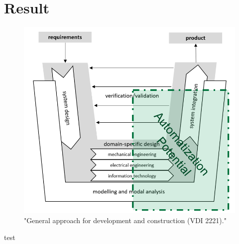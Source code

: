 \section{Result}

\begin{figure}[h]
    \centering
    \includegraphics[scale=0.5]{pics/VDI_2206.PNG}
    \caption{\label{pic:VDI2206} "General approach for development and construction (VDI 2221)." \cite{Jansch2006THEDO}}
\end{figure}
test